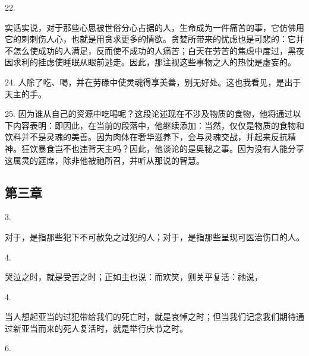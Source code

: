 22. \par

实话实说，对于那些心思被世俗分心占据的人，生命成为一件痛苦的事，它仿佛用它的刺刺伤人心，也就是用贪求更多的情欲。贪婪所带来的忧虑也是可悲的：它并不怎么使成功的人满足，反而使不成功的人痛苦；白天在劳苦的焦虑中度过，黑夜因求利的挂虑使睡眠从眼前逃走。因此，那注视这些事物之人的热忱是虚妄的。\par

24. 人除了吃、喝，并在劳碌中使灵魂得享美善，别无好处。这也我看见，是出于天主的手。\par

25. 因为谁从自己的资源中吃喝呢？这段论述现在不涉及物质的食物，他将通过以下内容表明：即因此，在当前的段落中，他继续添加：当然，仅仅是物质的食物和饮料并不是灵魂的美善。因为肉体在奢华滋养下，会与灵魂交战，并起来反抗精神。狂饮暴食岂不也违背天主吗？因此，他谈论的是奥秘之事。因为没有人能分享这属灵的筵席，除非他被祂所召，并听从那说的智慧。\par


\subsection{第三章}

3. \par

对于，是指那些犯下不可赦免之过犯的人；对于，是指那些呈现可医治伤口的人。\par

4. \par

哭泣之时，就是受苦之时；正如主也说：而欢笑，则关乎复活：祂说，\par

4. \par

当人想起亚当的过犯带给我们的死亡时，就是哀悼之时；但当我们记念我们期待通过新亚当而来的死人复活时，就是举行庆节之时。\par

6. \par

